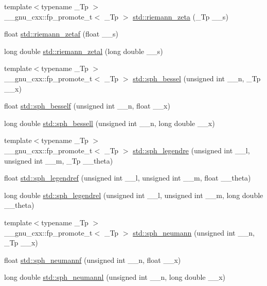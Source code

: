 \begin{DoxyCompactItemize}
\item 
{\footnotesize template$<$typename \+\_\+\+Tp $>$ }\\\+\_\+\+\_\+gnu\+\_\+cxx\+::fp\+\_\+promote\+\_\+t$<$ \+\_\+\+Tp $>$ \hyperlink{group__cxx17__math__spec__func_gac4ef9d52ee583c77937c3a420b7c72ca}{std\+::riemann\+\_\+zeta} (\+\_\+\+Tp \+\_\+\+\_\+s)
\item 
float \hyperlink{group__cxx17__math__spec__func_gaf92063315061a56d3e2c4053156d968e}{std\+::riemann\+\_\+zetaf} (float \+\_\+\+\_\+s)
\item 
long double \hyperlink{group__cxx17__math__spec__func_ga1e92da3b878d75270f38d3ec9b513086}{std\+::riemann\+\_\+zetal} (long double \+\_\+\+\_\+s)
\item 
{\footnotesize template$<$typename \+\_\+\+Tp $>$ }\\\+\_\+\+\_\+gnu\+\_\+cxx\+::fp\+\_\+promote\+\_\+t$<$ \+\_\+\+Tp $>$ \hyperlink{group__cxx17__math__spec__func_gad125841d7c85e461cb8954952e3a17c8}{std\+::sph\+\_\+bessel} (unsigned int \+\_\+\+\_\+n, \+\_\+\+Tp \+\_\+\+\_\+x)
\item 
float \hyperlink{group__cxx17__math__spec__func_ga534e36e1dcefad8daec98920db16eec4}{std\+::sph\+\_\+besself} (unsigned int \+\_\+\+\_\+n, float \+\_\+\+\_\+x)
\item 
long double \hyperlink{group__cxx17__math__spec__func_ga11d72b1af81ce9da3c878a25087ee927}{std\+::sph\+\_\+bessell} (unsigned int \+\_\+\+\_\+n, long double \+\_\+\+\_\+x)
\item 
{\footnotesize template$<$typename \+\_\+\+Tp $>$ }\\\+\_\+\+\_\+gnu\+\_\+cxx\+::fp\+\_\+promote\+\_\+t$<$ \+\_\+\+Tp $>$ \hyperlink{group__cxx17__math__spec__func_gacef0d41a7ce572a9ace3437498794ed0}{std\+::sph\+\_\+legendre} (unsigned int \+\_\+\+\_\+l, unsigned int \+\_\+\+\_\+m, \+\_\+\+Tp \+\_\+\+\_\+theta)
\item 
float \hyperlink{group__cxx17__math__spec__func_gaae635d28c06a3be2679901b382090852}{std\+::sph\+\_\+legendref} (unsigned int \+\_\+\+\_\+l, unsigned int \+\_\+\+\_\+m, float \+\_\+\+\_\+theta)
\item 
long double \hyperlink{group__cxx17__math__spec__func_ga2f6618dea1847f09fd67f3c974c1910d}{std\+::sph\+\_\+legendrel} (unsigned int \+\_\+\+\_\+l, unsigned int \+\_\+\+\_\+m, long double \+\_\+\+\_\+theta)
\item 
{\footnotesize template$<$typename \+\_\+\+Tp $>$ }\\\+\_\+\+\_\+gnu\+\_\+cxx\+::fp\+\_\+promote\+\_\+t$<$ \+\_\+\+Tp $>$ \hyperlink{group__cxx17__math__spec__func_ga01cdd716aaca8ff3c08f307800fd5220}{std\+::sph\+\_\+neumann} (unsigned int \+\_\+\+\_\+n, \+\_\+\+Tp \+\_\+\+\_\+x)
\item 
float \hyperlink{group__cxx17__math__spec__func_ga789143122fa99536329bc2d1b1aac2f0}{std\+::sph\+\_\+neumannf} (unsigned int \+\_\+\+\_\+n, float \+\_\+\+\_\+x)
\item 
long double \hyperlink{group__cxx17__math__spec__func_ga3cededa9b6e4601f190c3811e6aabfd6}{std\+::sph\+\_\+neumannl} (unsigned int \+\_\+\+\_\+n, long double \+\_\+\+\_\+x)
\end{DoxyCompactItemize}


